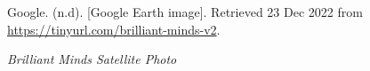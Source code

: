 \begin{figure}[hbtp]
\caption[Brilliant Minds Satellite Photo]{\textit{Brilliant Minds Satellite Photo}}%
\label{fig:brilliant-minds-sat-photo}
{Google. (n.d). [Google Earth image]. Retrieved 23 Dec 2022 from \url{https://tinyurl.com/brilliant-minds-v2}.}
\end{figure}


